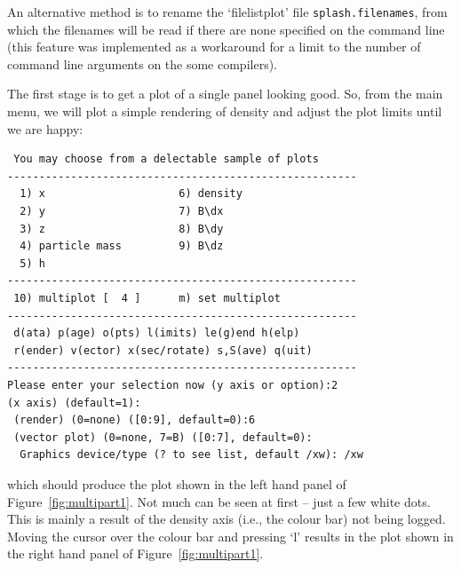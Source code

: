 \documentclass[a4paper,10pt]{article}
\begin{document}
An alternative method is to rename the `filelistplot' file \verb+splash.filenames+, from which the filenames will be read if there are none specified on the command line (this feature was implemented as a workaround for a limit to the number of command line arguments on the some compilers).

 The first stage is to get a plot of a single panel looking good. So, from the main menu, we will plot a simple rendering of density and adjust the plot limits until we are happy:
\begin{verbatim}
 You may choose from a delectable sample of plots 
-------------------------------------------------------
  1) x                     6) density             
  2) y                     7) B\dx                
  3) z                     8) B\dy                
  4) particle mass         9) B\dz                
  5) h                   
-------------------------------------------------------
 10) multiplot [  4 ]      m) set multiplot 
-------------------------------------------------------
 d(ata) p(age) o(pts) l(imits) le(g)end h(elp)
 r(ender) v(ector) x(sec/rotate) s,S(ave) q(uit)
-------------------------------------------------------
Please enter your selection now (y axis or option):2
(x axis) (default=1):
 (render) (0=none) ([0:9], default=0):6
 (vector plot) (0=none, 7=B) ([0:7], default=0):
  Graphics device/type (? to see list, default /xw): /xw
\end{verbatim}
which should produce the plot shown in the left hand panel of Figure~\ref{fig:multipart1}. Not much can be seen at first -- just a few white dots. This is mainly a result of the density axis (i.e., the colour bar) not being logged. Moving the cursor over the colour bar and pressing `l' results in the plot shown in the right hand panel of Figure~\ref{fig:multipart1}.
\end{document}

